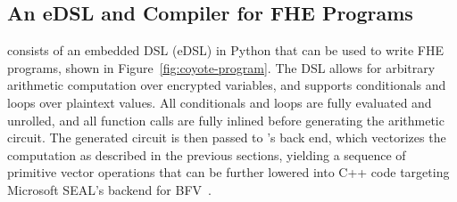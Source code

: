 
\subsection{An eDSL and Compiler for FHE Programs}\label{sec:surface-language}
\system consists of an embedded DSL (eDSL) in Python that can be used to write FHE programs, shown in Figure~\ref{fig:coyote-program}.
The DSL allows for arbitrary arithmetic computation over encrypted variables, and supports conditionals and loops over plaintext values. 
All conditionals and loops are fully evaluated and unrolled, and all function calls are fully inlined before generating the arithmetic circuit.
The generated circuit is then passed to \system's back end, which vectorizes the computation as described in the previous sections, yielding a sequence of primitive vector operations that can be further lowered into C++ code targeting Microsoft SEAL's backend for BFV~\cite{seal}.

